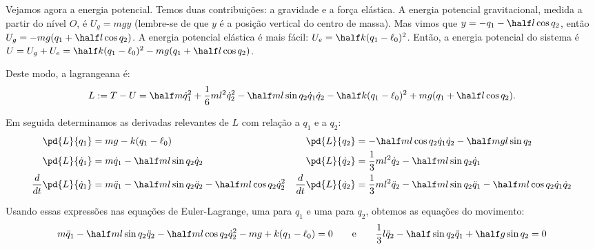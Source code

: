 \begin{question}
\begin{solution}
      Vejamos agora a energia potencial.
      Temos duas contribuições: a gravidade e a força elástica.
      A energia potencial gravitacional, medida a partir do nível $O$, é $U_g = mgy$ (lembre-se de que $y$ é a posição vertical do centro de massa).
      Mas vimos que $y = -q_1 - \half l \cos q_2$, então $U_g = -mg(q_1 + \half l \cos q_2)$.
      A energia potencial elástica é mais fácil: $U_e = \half k (q_1 - \ell_0)^2$.
      Então, a energia potencial do sistema é $U = U_g + U_e = \half k (q_1 - \ell_0)^2-mg(q_1 + \half l \cos q_2)$.

      Deste modo, a lagrangeana é:
      \begin{equation*}
        L := T - U = \half m \dot q_1^2 + \frac{1}{6} m l^2 \dot q_2^2 - \half m l \sin q_2 \dot q_1 \dot q_2 - \half k (q_1 - \ell_0)^2 + mg(q_1 + \half l \cos q_2).
      \end{equation*}

      Em seguida determinamos as derivadas relevantes de $L$ com relação a $q_1$ e a $q_2$:
      \begin{align*}
        \pd{L}{q_1} &= mg - k(q_1 - \ell_0)
          & \pd{L}{q_2} &= -\half m l \cos q_2 \dot q_1 \dot q_2 - \half mgl \sin q_2 \\
        \pd{L}{\dot q_1} &= m\dot q_1 - \half m l \sin q_2 \dot q_2
          & \pd{L}{\dot q_2} &= \frac{1}{3} ml^2 \dot q_2 - \half m l \sin q_2 \dot q_1 \\
        \frac{d}{dt}\pd{L}{\dot q_1} &= m\ddot q_1 - \half m l \sin q_2 \ddot q_2 - \half m l \cos q_2 \dot q_2^2
          & \frac{d}{dt}\pd{L}{\dot q_2} &= \frac{1}{3} m l^2 \ddot q_2 - \half m l \sin q_2 \ddot q_1 - \half m l \cos q_2 \dot q_1 \dot q_2
      \end{align*}

      Usando essas expressões nas equações de Euler-Lagrange, uma para $q_1$ e uma para $q_2$, obtemos as equações do movimento:
      \begin{equation*}
      m \ddot q_1 - \half m l \sin q_2 \ddot q_2 - \half m l \cos q_2 \dot q_2^2 - mg + k (q_1 - \ell_0) = 0
      \qquad\text{e}\qquad
      \frac{1}{3} l \ddot q_2 - \half \sin q_2 \ddot q_1 + \half g \sin q_2 = 0
      \end{equation*}
    \end{solution}
\end{question}
